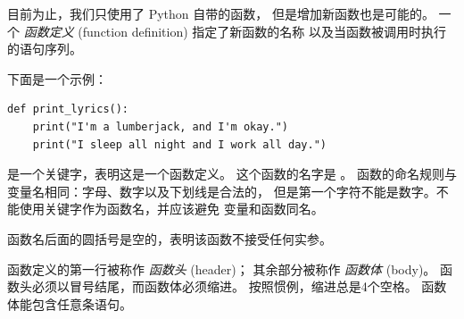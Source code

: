 目前为止，我们只使用了 Python 自带的函数， 但是增加新函数也是可能的。
一个 {\em 函数定义} (function definition) 指定了新函数的名称
以及当函数被调用时执行的语句序列。
    
    


下面是一个示例：


\begin{lstlisting}
def print_lyrics():
    print("I'm a lumberjack, and I'm okay.")
    print("I sleep all night and I work all day.")
\end{lstlisting}

%

 是一个关键字，表明这是一个函数定义。
这个函数的名字是 。
函数的命名规则与变量名相同：字母、数字以及下划线是合法的，
但是第一个字符不能是数字。不能使用关键字作为函数名，并应该避免
变量和函数同名。
    


函数名后面的圆括号是空的，表明该函数不接受任何实参。
  
    


函数定义的第一行被称作 {\em 函数头} (header)； 其余部分被称作 {\em 函数体} (body)。 函数头必须以冒号结尾，而函数体必须缩进。 按照惯例，缩进总是4个空格。 函数体能包含任意条语句。


